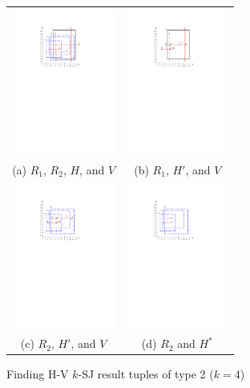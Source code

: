 \documentclass[acmsmall,review,anonymous]{acmart}
\def\figcapup{\vspace{-2mm}}
\def\figcapdown{\vspace{-4mm}}
\begin{document}
{{{\begin{figure}
    \begin{tabular}{cc}
        \includegraphics[height=48mm]{./artwork/alg-ex2-a} &
        \includegraphics[height=48mm]{./artwork/alg-ex2-b} \\
        (a) $R_1$, $R_2$, $H$, and $V$ &
        (b) $R_1$, $H'$, and $V$ \\ [2mm]
        \includegraphics[height=48mm]{./artwork/alg-ex2-c} &
        \includegraphics[height=48mm]{./artwork/alg-ex2-d} \\
        (c) $R_2$, $H'$, and $V$ &
        (d) $R_2$ and $H^*$
    \end{tabular}
    \figcapup
    \caption{Finding H-V $k$-SJ result tuples of type 2 ($k = 4$)}
    \label{fig:hv:type2:ex}
    \figcapdown
\end{figure}


}}}
\end{document}
